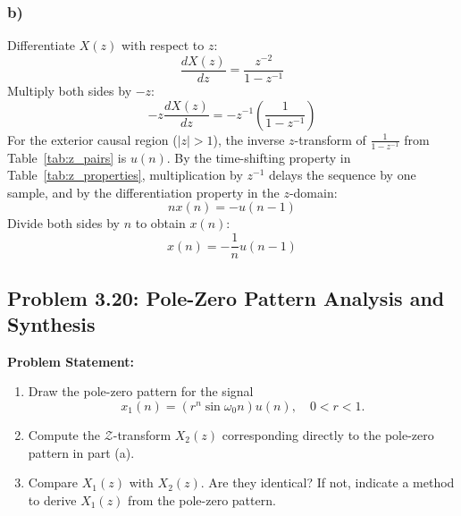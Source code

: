 \documentclass[12pt,a4paper]{article}
\begin{document}
\subsubsection*{b)}
Differentiate $X(z)$ with respect to $z$:
\[
\frac{dX(z)}{dz} = \frac{z^{-2}}{1 - z^{-1}}
\]
Multiply both sides by $-z$:
\[
-z\frac{dX(z)}{dz} = -z^{-1}\left(\frac{1}{1 - z^{-1}}\right)
\]
For the exterior causal region ($|z| > 1$), the inverse $z$-transform of $\frac{1}{1 - z^{-1}}$ from Table~\ref{tab:z_pairs} is $u(n)$. By the time-shifting property in Table~\ref{tab:z_properties}, multiplication by $z^{-1}$ delays the sequence by one sample, and by the differentiation property in the $z$-domain:
\[
nx(n) = -u(n - 1)
\]
Divide both sides by $n$ to obtain $x(n)$:
\[
x(n) = -\frac{1}{n}u(n - 1)
\]

\subsection{Problem 3.20: Pole-Zero Pattern Analysis and Synthesis}
\textbf{Problem Statement:}
\begin{enumerate}[label=(\alph*)]
    \item Draw the pole-zero pattern for the signal
    \begin{equation}
        x_1(n) = (r^n \sin\omega_0 n) u(n), \quad 0 < r < 1.
        \label{eq:p320_sig}
    \end{equation}
    \item Compute the $\mathcal{Z}$-transform $X_2(z)$ corresponding directly to the pole-zero pattern in part (a).
    \item Compare $X_1(z)$ with $X_2(z)$. Are they identical? If not, indicate a method to derive $X_1(z)$ from the pole-zero pattern.
\end{enumerate}
\end{document}
